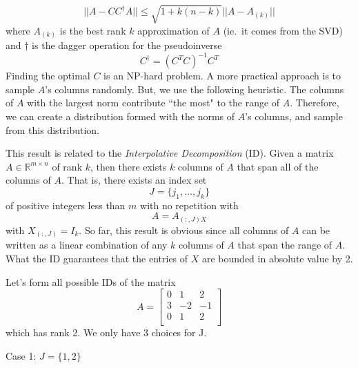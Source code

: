 \begin{equation*}
    || A-CC^\dagger A || \leq \sqrt{1 + k(n-k)} || A-A_{(k)}||
\end{equation*}
where $A_{(k)}$ is the best rank $k$ approximation of $A$ (ie.\ it comes from the SVD) and $\dagger$ is the dagger operation for the pseudoinverse
\begin{equation*}
    C^\dagger = (C^TC)^{-1}C^T
\end{equation*}
Finding the optimal $C$ is an NP-hard problem. A more practical approach is to sample $A$'s columns randomly. But, we use the following heuristic. The columns of $A$ with the largest norm contribute ``the most" to the range of $A$. Therefore, we can create a distribution formed with the norms of $A$'s columns, and sample from this distribution.

This result is related to the \emph{Interpolative Decomposition} (ID). Given a matrix $A\in\mathbb{R}^{m \times n}$ of rank $k$, then there exists $k$ columns of $A$ that span all of the columns of $A$. That is, there exists an index set
\begin{equation*}
    J = \{j_1, \ldots, j_k \}
\end{equation*}
of positive integers less than $m$ with no repetition with
\begin{equation*}
    A = A_{(:, J) X}
\end{equation*}
with $X_{(:,J)} = I_k$. So far, this result is obvious since all columns of $A$ can be written as a linear combination of any $k$ columns of $A$ that span the range of $A$. What the ID guarantees that the entries of $X$ are bounded in absolute value by 2.

Let's form all possible IDs of the matrix
\begin{equation*}
    A =
    \begin{bmatrix}
        0 &  1 &  2 \\
        3 & -2 & -1 \\
        0 &  1 &  2 \\
    \end{bmatrix}
\end{equation*}
which has rank 2. We only have 3 choices for J.

Case 1: $J=\{1,2\}$

